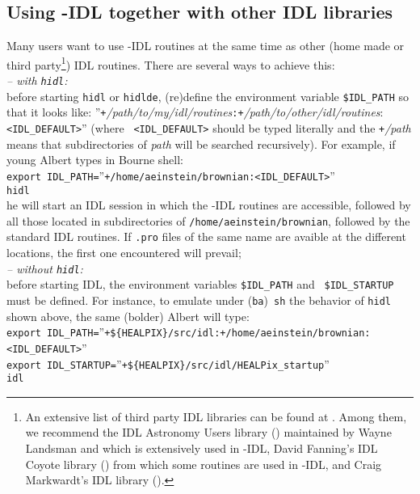 \documentclass[12pt,twoside]{article}
\makeatletter
\newcommand{\nop}[1]{\Hy@raisedlink{\hypertarget{#1}{}}}
\newcommand{\mytarget}[1]{%
\nop{#1}%
\phantomsection\label{#1}%
}%
\newcommand{\mytarget}[1]{\label{#1}}
\makeatother
\begin{document}
\subsection{Using \healpixns-IDL together with other IDL libraries}
\label{idl:other_idl_libs}
\mytarget{idl:other_idl_libs}
Many users want to use \healpixns-IDL routines at the same time as other (home made
or third party\footnote{
An extensive list of third party IDL libraries can be found at
.
Among them, we recommend 
the IDL Astronomy Users library
()
maintained by Wayne Landsman and which is extensively used in 
\healpixns-IDL,
David Fanning's IDL Coyote library
()
from which some routines are used in \healpixns-IDL, 
and
Craig Markwardt's IDL library
().}) 
IDL routines. There are several ways to achieve this:\\
%
{\em -- with {\tt hidl}:}\\
before starting {\tt hidl} or {\tt hidlde}, (re)define the environment variable {\tt \$IDL\_PATH} so that it looks like:
''{\tt +}{\it /path/to/my/idl/routines}{\tt :+}{\it /path/to/other/idl/routines}:{\tt
<IDL\_DEFAULT>}''
(where {\tt
<IDL\_DEFAULT>} should be typed literally and the {\tt +}{\it /path} means that
subdirectories of {\em path} will be searched recursively). For example, if
young Albert types in Bourne shell:\\
{\tt export IDL\_PATH=}''{\tt +/home/aeinstein/brownian:<IDL\_DEFAULT>}''\\
{\tt hidl}\\
he will start an IDL session in which the \healpixns-IDL routines are accessible, followed by all those located
in subdirectories of {\tt /home/aeinstein/brownian}, followed by the standard
IDL routines. If {\tt .pro} files of the same name are avaible at the different locations, the first
one encountered will prevail;\\
%
{\em -- without {\tt hidl}:}\\
before starting IDL, the environment variables {\tt \$IDL\_PATH} and {\tt
\$IDL\_STARTUP} must be defined. For instance, to emulate under ({\tt ba}){\tt
sh} the behavior of {\tt hidl} shown above, the same (bolder) Albert will type:\\
{\tt export IDL\_PATH=}''{\tt +\$\{HEALPIX\}/src/idl:+/home/aeinstein/brownian:<IDL\_DEFAULT>}''\\
{\tt export IDL\_STARTUP=}''{\tt +\$\{HEALPIX\}/src/idl/HEALPix\_startup}''\\
{\tt idl}
\end{document}
